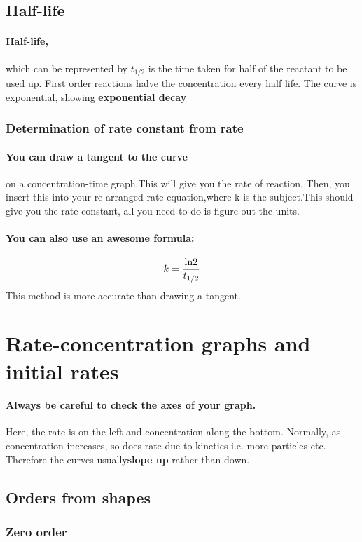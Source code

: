 \subsection{Half-life}
\paragraph{Half-life,}which can be represented by $t_{1/2}$ is the time taken for half of the reactant to be used up. First order reactions halve the concentration every half life. The curve is exponential, showing \textbf{exponential decay}
\subsubsection{Determination of rate constant from rate}
\paragraph{You can draw a tangent to the curve}on a concentration-time graph.This will give you the rate of reaction. Then, you insert this into your re-arranged rate equation,where k is the subject.This should give you the rate constant, all you need to do is figure out the units.
\paragraph{You can also use an awesome formula:}\begin{equation}
k=\frac{\textnormal{ln}2}{t_{1/2}}
\end{equation}
This method is more accurate than drawing a tangent.
\section{Rate-concentration graphs and initial rates}
\paragraph{Always be careful to check the axes of your graph.}Here, the rate is on the left and concentration along the bottom. Normally, as concentration increases, so does rate due to kinetics i.e. more particles etc. Therefore the curves usually\textbf{slope up} rather than down.
\subsection{Orders from shapes}
\subsubsection{Zero order}
